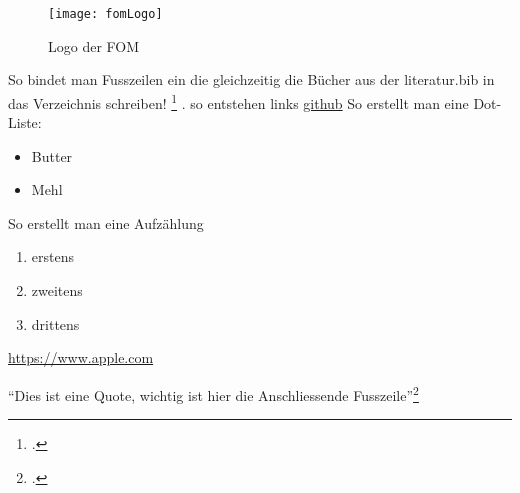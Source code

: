
 \begin{figure}[H]
 \begin{center}
 \texttt{[image: fomLogo]}
 \caption{Logo der FOM}
 \end{center}
 \end{figure}
 So bindet man Fusszeilen ein die gleichzeitig die Bücher aus der literatur.bib in das Verzeichnis schreiben! \footcite[Vgl. ][Seite 1]{Tanenbaum.2003} .
 so entstehen links \href{https://github.com/astonmatn/it_infr_tpaper.git}{github}
So erstellt man eine Dot-Liste:
\begin{itemize}
\item Butter
\item Mehl
\end{itemize}


So erstellt man eine Aufzählung
\begin{enumerate}
\item erstens
\item zweitens
\item drittens
\end{enumerate}

\url{https://www.apple.com}

\enquote{Dies ist eine Quote, wichtig ist hier die Anschliessende Fusszeile}\footcite[Vgl. ][Seite 111]{stern.0117}
